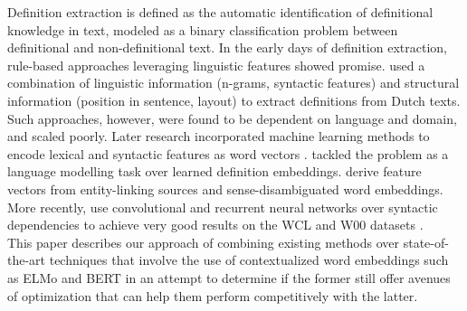 \documentclass[11pt]{article}
\begin{document}
Definition extraction is defined as the automatic identification of definitional knowledge in text, modeled as a binary
classification problem between definitional and non-definitional text. In the early days of definition extraction,
rule-based approaches leveraging linguistic features showed promise.  used a combination of
linguistic information (n-grams, syntactic features) and structural information (position in sentence, layout) to extract
definitions from Dutch texts. Such approaches, however, were found to be dependent on language and domain, and scaled poorly.
Later research incorporated machine learning methods to encode lexical and syntactic features as word vectors
\cite{del2014coping}.  tackled the problem as a language modelling task over learned definition
embeddings.  derive feature vectors from entity-linking sources and sense-disambiguated word
embeddings. More recently,  use convolutional and recurrent neural networks over syntactic dependencies to achieve very good results on the WCL and W00 datasets \cite{navigli2010learning,jin2013mining}.\\

This paper describes our approach of combining existing methods over state-of-the-art techniques that involve the use of
contextualized word embeddings such as ELMo \cite{peters2018deep} and BERT \cite{devlin2018bert} in an attempt to determine if
the former still offer avenues of optimization that can help them perform competitively with the latter.
\end{document}
